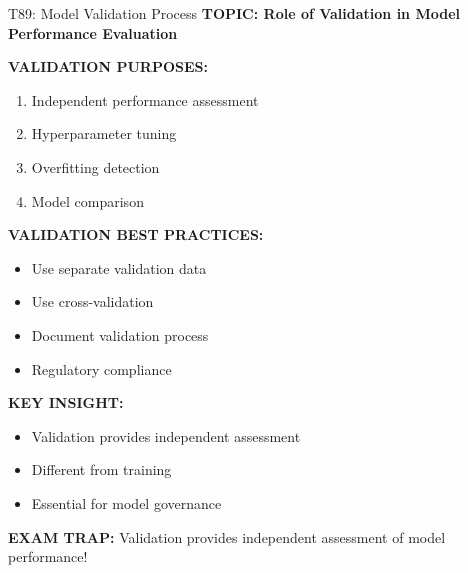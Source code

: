 \documentclass[8pt]{beamer}
\begin{document}
	\begin{frame}{T89: Model Validation Process}
		\fontsize{6.5}{7.5}\selectfont
		\textbf{TOPIC: Role of Validation in Model Performance Evaluation}
		
		\vspace{0.1cm}
		\textbf{VALIDATION PURPOSES:}
		\begin{enumerate}
			\item Independent performance assessment
			\item Hyperparameter tuning
			\item Overfitting detection
			\item Model comparison
		\end{enumerate}
		
		\vspace{0.1cm}
		\textbf{VALIDATION BEST PRACTICES:}
		\begin{itemize}
			\item Use separate validation data
			\item Use cross-validation
			\item Document validation process
			\item Regulatory compliance
		\end{itemize}
		
		\vspace{0.1cm}
		\textbf{KEY INSIGHT:}
		\begin{itemize}
			\item Validation provides independent assessment
			\item Different from training
			\item Essential for model governance
		\end{itemize}
		
		\textcolor{myred}{\textbf{EXAM TRAP:}} Validation provides \textcolor{myblue}{independent assessment} of model performance!
	\end{frame}
	
\end{document}
